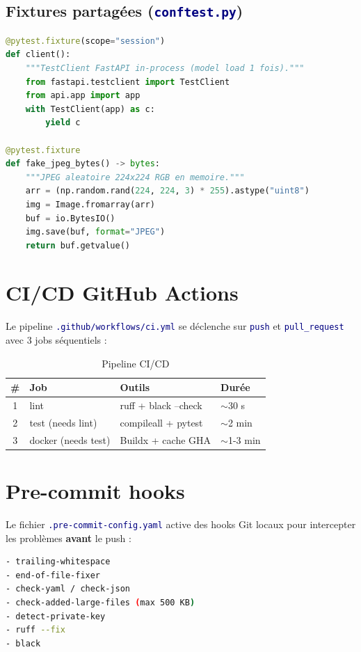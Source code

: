 \documentclass[11pt,a4paper,oneside]{report}
\newcommand{\code}[1]{\texttt{\textcolor{navy}{#1}}}
\begin{document}
\subsection{Fixtures partagées (\code{conftest.py})}

\begin{lstlisting}[language=Python, caption={Fixtures pytest}]
@pytest.fixture(scope="session")
def client():
    """TestClient FastAPI in-process (model load 1 fois)."""
    from fastapi.testclient import TestClient
    from api.app import app
    with TestClient(app) as c:
        yield c

@pytest.fixture
def fake_jpeg_bytes() -> bytes:
    """JPEG aleatoire 224x224 RGB en memoire."""
    arr = (np.random.rand(224, 224, 3) * 255).astype("uint8")
    img = Image.fromarray(arr)
    buf = io.BytesIO()
    img.save(buf, format="JPEG")
    return buf.getvalue()
\end{lstlisting}

\section{CI/CD GitHub Actions}

Le pipeline \code{.github/workflows/ci.yml} se déclenche sur \code{push} et \code{pull\_request} avec 3 jobs séquentiels :

\begin{table}[!htbp]
\centering
\caption{Pipeline CI/CD}
\begin{tabular}{|c|l|l|l|}
\hline
\textbf{\#} & \textbf{Job} & \textbf{Outils} & \textbf{Durée} \\
\hline
1 & lint & ruff + black --check & $\sim$30 s \\
\hline
2 & test (needs lint) & compileall + pytest & $\sim$2 min \\
\hline
3 & docker (needs test) & Buildx + cache GHA & $\sim$1-3 min \\
\hline
\end{tabular}
\end{table}

\section{Pre-commit hooks}

Le fichier \code{.pre-commit-config.yaml} active des hooks Git locaux pour intercepter les problèmes \textbf{avant} le push :

\begin{lstlisting}[language=Bash, caption={Hooks pre-commit configurés}]
- trailing-whitespace
- end-of-file-fixer
- check-yaml / check-json
- check-added-large-files (max 500 KB)
- detect-private-key
- ruff --fix
- black
\end{lstlisting}
\end{document}
